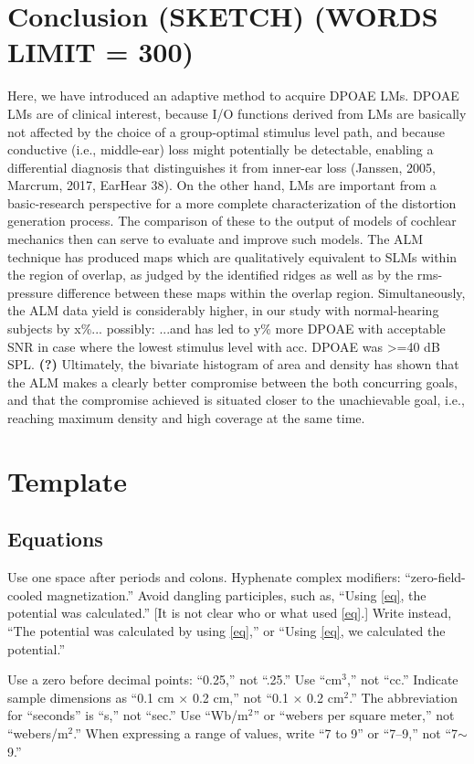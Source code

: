 \documentclass[journal,twoside,web]{ieeecolor2}
\begin{document}
\section{Conclusion (SKETCH) (WORDS LIMIT = 300)}
Here, we have introduced an adaptive method to acquire DPOAE LMs. DPOAE LMs are of clinical interest, because I/O functions derived from LMs are basically not affected by the choice of a group-optimal stimulus level path, and because conductive (i.e., middle-ear) loss might potentially be detectable, enabling a differential diagnosis that distinguishes it from inner-ear loss (Janssen, 2005, Marcrum, 2017, EarHear 38). On the other hand, LMs are important from a basic-research perspective for a more complete characterization of the distortion generation process. The comparison of these to the output of models of cochlear mechanics then can serve to evaluate and improve such models.
The ALM technique has produced maps which are qualitatively equivalent to SLMs within the region of overlap, as judged by the identified ridges as well as by the rms-pressure difference between these maps within the overlap region. Simultaneously, the ALM data yield is considerably higher, in our study with normal-hearing subjects by x\%... possibly: ...and has led to y\% more DPOAE with acceptable SNR in case where the lowest stimulus level with acc. DPOAE was >=40 dB SPL. {\bf (?)}
Ultimately, the bivariate histogram of area and density has shown that the ALM makes a clearly better compromise between the both concurring goals, and that the compromise achieved is situated closer to the unachievable goal, i.e., reaching maximum density and high coverage at the same time.


\section{Template}

\subsection{Equations}
Use one space after periods and colons.
Hyphenate complex modifiers: 
``zero-field-cooled magnetization.'' Avoid dangling participles, such as, 
``Using \eqref{eq}, the potential was calculated.'' [It is not clear who or what 
used \eqref{eq}.] Write instead, ``The potential was calculated by using \eqref{eq},'' or 
``Using \eqref{eq}, we calculated the potential.''

Use a zero before decimal points: ``0.25,'' not ``.25.'' Use 
``cm$^{3}$,'' not ``cc.'' Indicate sample dimensions as ``0.1 cm 
$\times $ 0.2 cm,'' not ``0.1 $\times $ 0.2 cm$^{2}$.'' The 
abbreviation for ``seconds'' is ``s,'' not ``sec.'' Use 
``Wb/m$^{2}$'' or ``webers per square meter,'' not 
``webers/m$^{2}$.'' When expressing a range of values, write ``7 to 
9'' or ``7--9,'' not ``7$\sim $9.''
\end{document}
